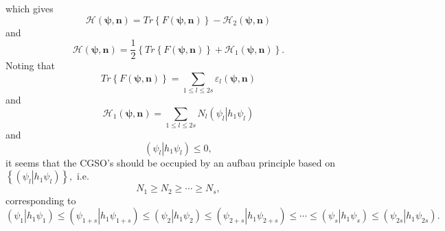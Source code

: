 \documentclass[aps,preprint]{revtex4}%
\begin{document}
which gives
\begin{equation}
\mathcal{H}\left(  \mathbf{\psi,n}\right)  =Tr\left\{  F\left(  \mathbf{\psi
,n}\right)  \right\}  -\mathcal{H}_{2}\left(  \mathbf{\psi,n}\right)
\end{equation}
and
\begin{equation}
\mathcal{H}\left(  \mathbf{\psi,n}\right)  =\frac{1}{2}\left\{  Tr\left\{
F\left(  \mathbf{\psi,n}\right)  \right\}  +\mathcal{H}_{1}\left(
\mathbf{\psi,n}\right)  \right\}  .
\end{equation}
Noting that
\begin{equation}
Tr\left\{  F\left(  \mathbf{\psi,n}\right)  \right\}  =%
{\textstyle\sum\limits_{1\leq l\leq2s}}
\varepsilon_{l}\left(  \mathbf{\psi,n}\right)
\end{equation}
and
\begin{equation}
\mathcal{H}_{1}\left(  \mathbf{\psi,n}\right)  =%
{\textstyle\sum\limits_{1\leq l\leq2s}}
N_{l}\left(  \left.  \psi_{l}\right\vert h_{1}\psi_{l}\right)
\end{equation}
and
\begin{equation}
\left(  \left.  \psi_{l}\right\vert h_{1}\psi_{l}\right)  \leq0,
\end{equation}
it seems that the CGSO's should be occupied by an aufbau principle based on
$\left\{  \left(  \left.  \psi_{l}\right\vert h_{1}\psi_{l}\right)  \right\}
,$ i.e.
\begin{equation}
N_{1}\geq N_{2}\geq\cdots\geq N_{s},
\end{equation}
corresponding to
\begin{equation}
\left(  \left.  \psi_{1}\right\vert h_{1}\psi_{1}\right)  \leq\left(  \left.
\psi_{1+s}\right\vert h_{1}\psi_{1+s}\right)  \leq\left(  \left.  \psi
_{2}\right\vert h_{1}\psi_{2}\right)  \leq\left(  \left.  \psi_{2+s}%
\right\vert h_{1}\psi_{2+s}\right)  \leq\cdots\leq\left(  \left.  \psi
_{s}\right\vert h_{1}\psi_{s}\right)  \leq\left(  \left.  \psi_{2s}\right\vert
h_{1}\psi_{2s}\right)  .
\end{equation}
\end{document}
